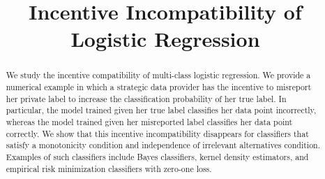 \documentclass{article}
\title{Incentive Incompatibility of Logistic Regression}
\author{}
\begin{document}
\newtheorem{thm}{Theorem}
\newtheorem{cor}{Corollary}
\newtheorem{lem}{Lemma}
\newtheorem{prop}{Proposition}
\newtheorem{conj}{Conjecture}
\newtheorem{algo}{Algorithm}
\newtheorem{obs}{Observation}
\newtheorem{clm}{Claim}
\theoremstyle{definition}
\newtheorem{df}{Definition}
\newtheorem{eg}{Example}
\newtheorem{asm}{Assumption}
\newtheorem{cond}{Condition}
\theoremstyle{remark}
\newtheorem{rmk}{Remark}
\maketitle \allowdisplaybreaks \raggedbottom
\begin{abstract}
We study the incentive compatibility of multi-class logistic regression. We provide a numerical example in which a strategic data provider has the incentive to misreport her private label to increase the classification probability of her true label. In particular, the model trained given her true label classifies her data point incorrectly, whereas the model trained given her misreported label classifies her data point correctly. We show that this incentive incompatibility disappears for classifiers that satisfy a monotonicity condition and independence of irrelevant alternatives condition. Examples of such classifiers include Bayes classifiers, kernel density estimators, and empirical risk minimization classifiers with zero-one loss.
\newline \newline

\end{abstract}
\end{document}
